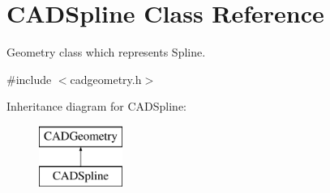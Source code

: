 \hypertarget{class_c_a_d_spline}{}\section{C\+A\+D\+Spline Class Reference}
\label{class_c_a_d_spline}


Geometry class which represents Spline.  




{\ttfamily \#include $<$cadgeometry.\+h$>$}

Inheritance diagram for C\+A\+D\+Spline\+:\begin{figure}[H]
\begin{center}
\leavevmode
\includegraphics[height=2.000000cm]{class_c_a_d_spline}
\end{center}
\end{figure}
